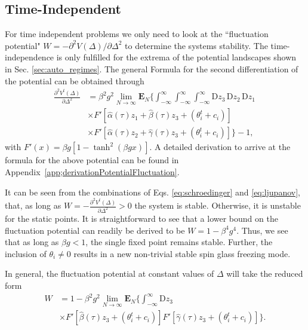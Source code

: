 \documentclass[reprint,amsmath,amssymb,aps]{revtex4-2}
\begin{document}
\subsection{Time-Independent}
For time independent problems we only need to look at the ``fluctuation potential" $W=-\partial^2 V(\Delta)/\partial\Delta^2$ to determine the systems stability. The time-independence is only fulfilled for the extrema of the potential landscapes shown in Sec. \ref{sec:auto_regimes}. The general Formula for the second differentiation of the potential can be obtained through 
\begin{align*}
    \frac{\partial^2 V^t(\Delta)}{\partial \Delta^2}
    &= 
    \beta^2g^2 \lim_{N\to\infty} \mathbf{E}_{N} \Bigg\{
    \int_{-\infty}^\infty \int_{-\infty}^\infty \int_{-\infty}^\infty \mathrm{D}z_3 \, \mathrm{D}z_2 \, \mathrm{D}z_1 \, 
    \\
    &\times
    F'\left[\hat{\alpha}(\tau) z_1 + \hat{\beta}(\tau) z_3 + (\theta_i^t + c_i)\right]
    \\
    &\times
    F'\left[\hat{\alpha}(\tau) z_2 + \hat{\gamma}(\tau) z_3 + (\theta_i^{t} + c_i)\right]
    \Bigg\} - 1,
\end{align*}
with $F'(x) = \beta g\left[1-\tanh^2(\beta g x)\right]$. A detailed derivation to arrive at the formula for the above potential can be found in Appendix~\ref{app;derivationPotentialFluctuation}.

It can be seen from the combinations of Eqs. \eqref{eq:schroedinger} and \eqref{eq:ljupanov}, that, as long as $W=-\frac{\partial^2 V^t(\Delta)}{\partial \Delta^2}>0$ the system is stable. Otherwise, it is unstable for the static points. It is straightforward to see that a lower bound on the fluctuation potential can readily be derived to be $W=1-\beta^4 g^4$. Thus, we see that as long as $\beta g<1$, the single fixed point remains stable. Further, the inclusion of $\theta_i\neq0$ results in a new non-trivial stable spin glass freezing mode.

In general, the fluctuation potential at constant values of $\Delta$ will take the reduced form
\begin{align*}
    W
    &=
    1 - \beta^2g^2 \lim_{N\to\infty} \mathbf{E}_{N} \Bigg\{
    \int_{-\infty}^\infty \mathrm{D}z_3 \, 
    \\
    &
    \nonumber
    \times
    F'\left[\hat{\beta}(\tau) z_3 + (\theta_i^t + c_i)\right]
    F'\left[\hat{\gamma}(\tau) z_3 + (\theta_i^{t} + c_i)\right]
    \Bigg\}.
\end{align*}
\end{document}
